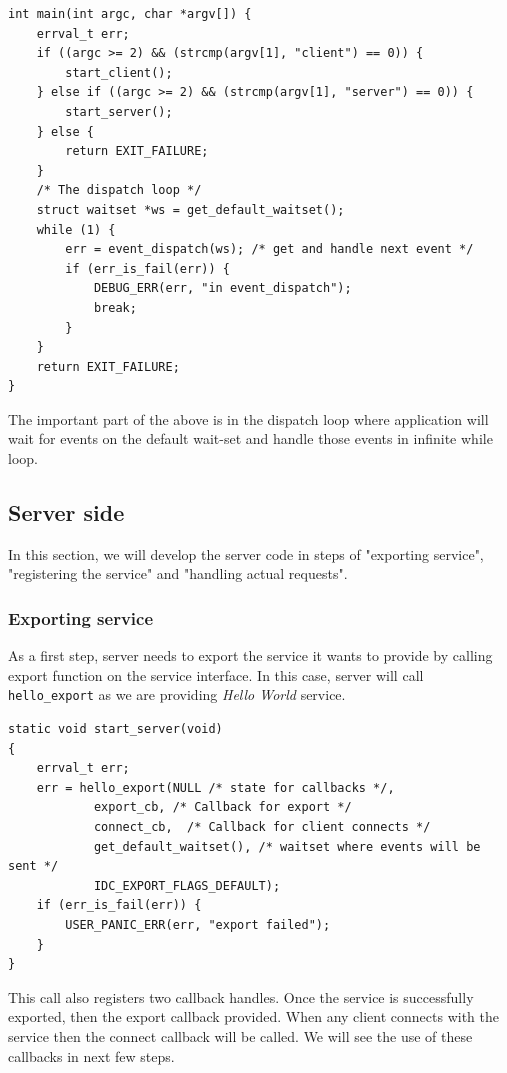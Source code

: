 \begin{verbatim}
int main(int argc, char *argv[]) {
    errval_t err;
    if ((argc >= 2) && (strcmp(argv[1], "client") == 0)) {
        start_client();
    } else if ((argc >= 2) && (strcmp(argv[1], "server") == 0)) {
        start_server();
    } else {
        return EXIT_FAILURE;
    }
    /* The dispatch loop */
    struct waitset *ws = get_default_waitset();
    while (1) {
        err = event_dispatch(ws); /* get and handle next event */
        if (err_is_fail(err)) {
            DEBUG_ERR(err, "in event_dispatch");
            break;
        }
    }
    return EXIT_FAILURE;
}
\end{verbatim}

The important part of the above is in the dispatch loop where application
will wait for events on the default wait-set and handle those events
in infinite while loop.

\subsection{Server side}

In this section, we will develop the server code in steps of
"exporting service", "registering the service" and "handling actual requests".


\subsubsection{Exporting service}
As a first step, server needs to export the service it wants to provide
by calling export function on the service interface.  In this case, server
will call \texttt{hello\_export} as we are providing \textit{Hello World}
service.

\begin{verbatim}
static void start_server(void)
{
    errval_t err;
    err = hello_export(NULL /* state for callbacks */,
            export_cb, /* Callback for export */
            connect_cb,  /* Callback for client connects */
            get_default_waitset(), /* waitset where events will be sent */
            IDC_EXPORT_FLAGS_DEFAULT);
    if (err_is_fail(err)) {
        USER_PANIC_ERR(err, "export failed");
    }
}
\end{verbatim}

This call also registers two callback handles.  Once the service
is successfully exported, then the export callback provided.  When any client
connects with the service then the connect callback will be called.
We will see the use of these callbacks in next few steps.


